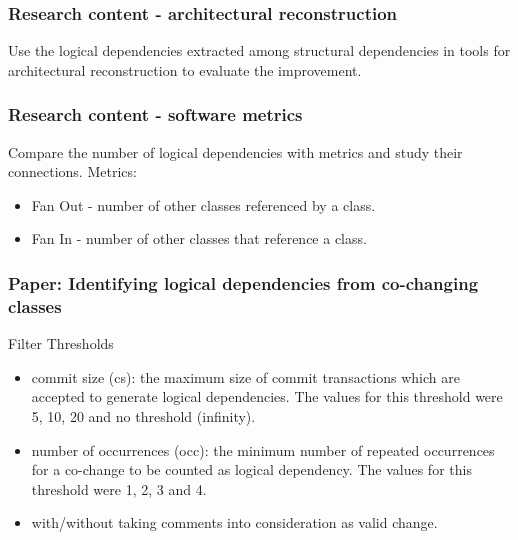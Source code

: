 \documentclass{beamer}
\begin{document}
 \begin{frame}
\frametitle{Research content - architectural reconstruction}
Use the logical dependencies extracted among structural dependencies in tools for architectural reconstruction to evaluate the improvement.

\end{frame}

 \begin{frame}
\frametitle{Research content - software metrics}
Compare the number of logical dependencies with metrics and study their connections. Metrics:
\begin{itemize}
	\item  Fan Out - number of other classes referenced by a class.
	\item  Fan In - number of other classes that reference a class.
\end{itemize}

\end{frame}


 \begin{frame}
\frametitle{Paper: Identifying logical dependencies from co-changing classes}
Filter Thresholds
\begin{itemize}
	\item commit size (cs): the maximum size of commit transactions
which are accepted to generate logical dependencies. The
values for this threshold were 5, 10, 20 and no threshold (infinity).
	\item  number of occurrences (occ): the minimum number of
repeated occurrences for a co-change to be counted as logical
dependency. The values for this threshold were 1, 2, 3 and 4.
	\item with/without taking comments into consideration as valid
change.
\end{itemize}

\end{frame}

\end{document}

